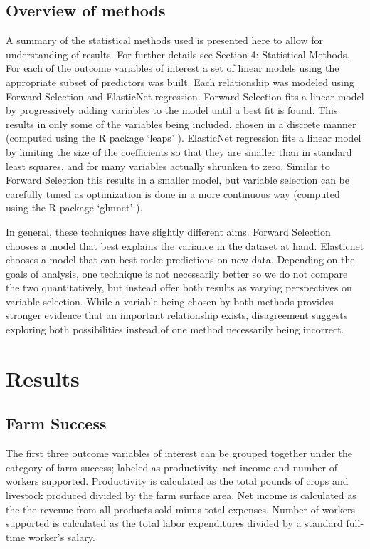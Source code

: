 \documentclass{article}
\begin{document}
\subsection{Overview of methods}

A summary of the statistical methods used is presented here to allow for understanding of results. For further details see 
Section 4: Statistical Methods. For each of the outcome variables of interest a set of linear models using the appropriate subset 
of predictors was built. Each relationship was modeled 
using Forward Selection and ElasticNet regression. Forward Selection fits a linear model by progressively adding variables to 
the model until a best fit is found. This results in only some of the variables being included, chosen in a discrete manner (computed using the R package `leaps' \cite{lumley}). 
ElasticNet regression fits a linear model by limiting the size of the coefficients so that they are smaller than in standard least 
squares, and for many variables actually shrunken to zero. Similar to Forward Selection this results in a smaller model, but 
variable selection can be carefully tuned as optimization is done in a more continuous way (computed using the R package `glmnet' \cite{friedman}).

In general, these techniques have slightly different aims. Forward Selection chooses a model that best explains the variance in 
the dataset at hand. Elasticnet chooses a model that can best make predictions on new data. Depending on the goals of 
analysis, one technique is not necessarily better so we do not compare the two quantitatively, but instead offer both results as 
varying perspectives on variable selection. While a variable being chosen by both methods provides stronger evidence that an 
important relationship exists, disagreement suggests exploring both possibilities instead of one method necessarily being 
incorrect.

\section{Results}

\subsection{Farm Success}

The first three outcome variables of interest can be grouped together under the category of farm success; labeled as 
productivity, net income and number of workers supported. Productivity is calculated as the total pounds of crops and livestock 
produced divided by the farm surface area. Net income is calculated as the the revenue from all products 
sold minus total expenses. Number of workers supported is calculated as the total labor expenditures divided by a standard 
full-time worker's salary.
\end{document}
